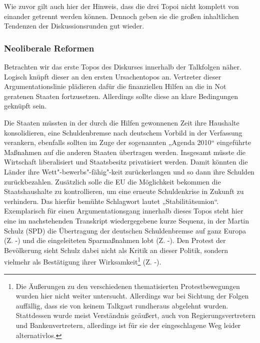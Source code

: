 Wie zuvor gilt auch hier der Hinweis, dass die drei Topoi nicht komplett von einander getrennt werden können. Dennoch geben sie die großen inhaltlichen Tendenzen der Diskussionsrunden gut wieder.

\subsubsection{Neoliberale Reformen}

Betrachten wir das erste Topos des Diskurses innerhalb der Talkfolgen näher. Logisch knüpft dieser an den ersten Ursachentopos an. Vertreter dieser Argumentationslinie plädieren dafür die finanziellen Hilfen an die in Not geratenen Staaten fortzusetzen. Allerdings sollte diese an klare Bedingungen geknüpft sein.

Die Staaten müssten in der durch die Hilfen gewonnenen Zeit ihre Haushalte konsolidieren, eine Schuldenbremse nach deutschem Vorbild in der Verfassung verankern, ebenfalls sollten im Zuge der sogenannten „Agenda 2010“ eingeführte Maßnahmen auf die anderen Staaten übertragen werden. Insgesamt müsste die Wirtschaft liberalisiert und Staatsbesitz privatisiert werden. Damit könnten die Länder ihre Wett"-bewerbs"-fähig"-keit zurückerlangen und so dann ihre Schulden zurückbezahlen. Zusätzlich solle die EU die Möglichkeit bekommen die Staatshaushalte zu kontrollieren, um eine erneute Schuldenkrise in Zukunft zu verhindern. Das hierfür bemühte Schlagwort lautet „Stabilitätsunion“. Exemplarisch für einen Argumentationsgang innerhalb dieses Topos steht hier eine im nachstehenden Transkript wiedergegebene kurze Sequenz, in der Martin Schulz (SPD) die Übertragung der deutschen Schuldenbremse auf ganz Europa (Z. -) und die eingeleiteten Sparmaßnahmen lobt (Z. -). Den Protest der Bevölkerung sieht Schulz dabei nicht als Kritik an dieser Politik, sondern vielmehr als Bestätigung ihrer Wirksamkeit\footnote{Die Äußerungen zu den verschiedenen thematisierten Protestbewegungen wurden hier nicht weiter untersucht. Allerdings war bei Sichtung der Folgen auffällig, dass sie von keinem Talkgast rundheraus abgelehnt wurden. Stattdessen wurde meist Verständnis geäußert, auch von Regierungsvertretern und Bankenvertretern, allerdings ist für sie der eingeschlagene Weg leider alternativlos.} (Z. -).

